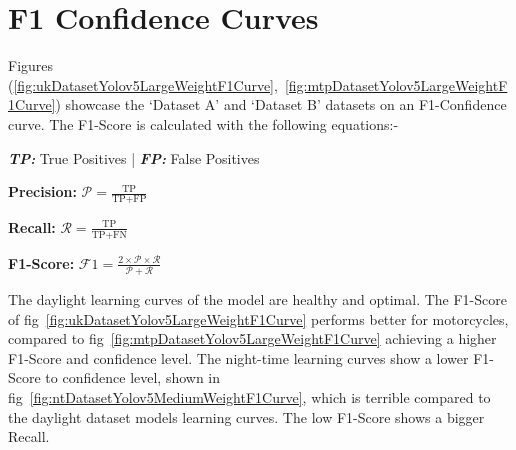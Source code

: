 \documentclass[12pt]{report} %
\begin{document}
	\clearpage
	\section{F1 Confidence Curves}
		Figures (\ref{fig:ukDatasetYolov5LargeWeightF1Curve},~\ref{fig:mtpDatasetYolov5LargeWeightF1Curve}) showcase the `Dataset A' and `Dataset B' datasets on an F1-Confidence curve. The F1-Score is calculated with the following equations:-
		\begin{center}
			\textbf{\textit{TP:}} True Positives | \textbf{\textit{FP:}} False Positives

			\textbf{Precision:} $\mathcal{P} = \frac{\text{TP}}{\text{TP} + \text{FP}}$

			\textbf{Recall:} $\mathcal{R} = \frac{\text{TP}}{\text{TP} + \text{FN}}$
			
			\textbf{F1-Score:} $\mathcal{F\textit{1}} = \frac{2 \times \mathcal{P} \times \mathcal{R}}{\mathcal{P} + \mathcal{R}}$
		\end{center}

		The daylight learning curves of the model are healthy and optimal. The F1-Score of fig~\ref{fig:ukDatasetYolov5LargeWeightF1Curve} performs better for motorcycles, compared to fig~\ref{fig:mtpDatasetYolov5LargeWeightF1Curve} achieving a higher F1-Score and confidence level. The night-time learning curves show a lower F1-Score to confidence level, shown in fig~\ref{fig:ntDatasetYolov5MediumWeightF1Curve}, which is terrible compared to the daylight dataset models learning curves. The low F1-Score shows a bigger Recall.
\end{document}
